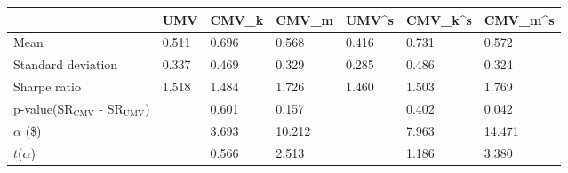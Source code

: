 \begin{tabular}{lllllll}
\toprule
 & UMV & CMV_k & CMV_m & UMV^s & CMV_k^s & CMV_m^s \\
\midrule
Mean & 0.511 & 0.696 & 0.568 & 0.416 & 0.731 & 0.572 \\
Standard deviation & 0.337 & 0.469 & 0.329 & 0.285 & 0.486 & 0.324 \\
Sharpe ratio & 1.518 & 1.484 & 1.726 & 1.460 & 1.503 & 1.769 \\
p-value(SR$_{\text{CMV}}$ - SR$_{\text{UMV}}$) &  & 0.601 & 0.157 &  & 0.402 & 0.042 \\
$\alpha$ (\$) &  & 3.693 & 10.212 &  & 7.963 & 14.471 \\
$t$($\alpha$) &  & 0.566 & 2.513 &  & 1.186 & 3.380 \\
\bottomrule
\end{tabular}

